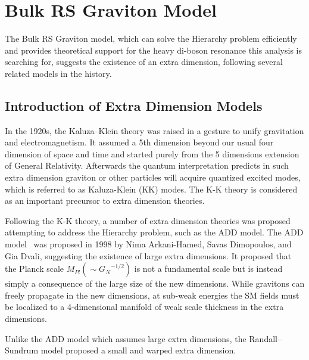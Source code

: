 \section{Bulk RS Graviton Model}
The Bulk RS Graviton model, which can solve the Hierarchy problem efficiently and provides theoretical support for the heavy di-boson resonance this analysis is searching for, suggests the existence of an extra dimension, following several related models in the history.
\subsection{Introduction of Extra Dimension Models}
In the 1920s, the Kaluza–Klein theory was raised in a gesture to unify gravitation and electromagnetism. It assumed a 5th dimension beyond our usual four dimension of space and time and started purely from the 5 dimensions extension of General Relativity. Afterwards the quantum interpretation predicts in such extra dimension graviton or other particles will acquire quantized excited modes, which is referred to as Kaluza-Klein (KK) modes. The K-K theory is considered as an important precursor to extra dimension theories.

\vspace{0.3cm}
Following the K-K theory, a number of extra dimension theories was proposed attempting to address the Hierarchy problem, such as the ADD model. The ADD model~\cite{Intro_ADD,Intro_ADD2} was proposed in 1998 by Nima Arkani-Hamed, Savas Dimopoulos, and Gia Dvali, suggesting the existence of large extra dimensions. It proposed that the Planck scale $M_{Pl}(\sim{G_{N}}^{-1/2})$ is not a fundamental scale but is instead simply a consequence of the large size of the new dimensions. While gravitons can freely propagate in the new dimensions, at sub-weak energies the SM fields must be localized to a 4-dimensional manifold of weak scale thickness in the extra dimensions. 

\vspace{0.3cm}
Unlike the ADD model which assumes large extra dimensions, the Randall–Sundrum model proposed a small and warped extra dimension.
